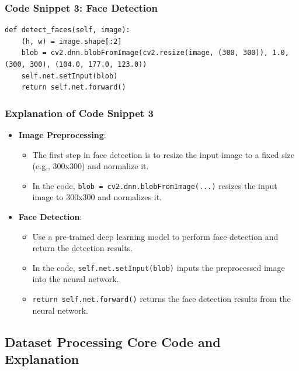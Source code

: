 \documentclass{article}
\begin{document}
\subsubsection{Code Snippet 3: Face Detection}
\begin{lstlisting}[basicstyle=\scriptsize\ttfamily, linewidth=\textwidth]
def detect_faces(self, image):
    (h, w) = image.shape[:2]
    blob = cv2.dnn.blobFromImage(cv2.resize(image, (300, 300)), 1.0, (300, 300), (104.0, 177.0, 123.0))
    self.net.setInput(blob)
    return self.net.forward()
\end{lstlisting}

\subsubsection{Explanation of Code Snippet 3}
\begin{itemize}
    \item \textbf{Image Preprocessing}:
    \begin{itemize}
        \item The first step in face detection is to resize the input image to a fixed size (e.g., 300x300) and normalize it.
        \item In the code, \texttt{blob = cv2.dnn.blobFromImage(...)} resizes the input image to 300x300 and normalizes it.
    \end{itemize}
    \item \textbf{Face Detection}:
    \begin{itemize}
        \item Use a pre-trained deep learning model to perform face detection and return the detection results.
        \item In the code, \texttt{self.net.setInput(blob)} inputs the preprocessed image into the neural network.
        \item \texttt{return self.net.forward()} returns the face detection results from the neural network.
    \end{itemize}
\end{itemize}

\subsection{Dataset Processing Core Code and Explanation}
\end{document}
